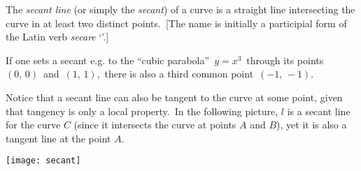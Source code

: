 \documentclass[12pt]{article}
\begin{document}
The {\em secant line} (or simply the {\em secant}) of  a curve is a straight line intersecting the curve in at least two distinct points.\, [The name is initially a participial form of the Latin verb {\em secare} `'.]

If one sets a secant e.g. to the ``cubic parabola''\, $y = x^3$\, through its points\, $(0,\,0)$\, and\, $(1,\,1)$,\, there is also a third common point\, 
$(-1,\,-1)$.

Notice that a secant line can also be tangent to the curve at some point, given that tangency is only a local property.\, In the following picture, $l$ is a secant line for the curve $C$ (since it intersects the curve at points $A$ and $B$), yet it is also a tangent line at the point $A$.
\begin{center}
\texttt{[image: secant]}
\end{center}
\end{document}
